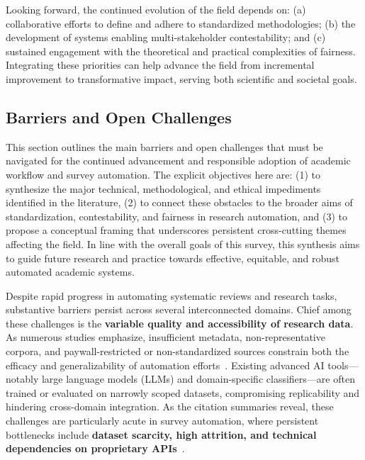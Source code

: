 \documentclass[sigconf]{acmart}
\begin{document}
Looking forward, the continued evolution of the field depends on: (a) collaborative efforts to define and adhere to standardized methodologies; (b) the development of systems enabling multi-stakeholder contestability; and (c) sustained engagement with the theoretical and practical complexities of fairness. Integrating these priorities can help advance the field from incremental improvement to transformative impact, serving both scientific and societal goals.

\subsection{Barriers and Open Challenges}

This section outlines the main barriers and open challenges that must be navigated for the continued advancement and responsible adoption of academic workflow and survey automation. The explicit objectives here are: (1) to synthesize the major technical, methodological, and ethical impediments identified in the literature, (2) to connect these obstacles to the broader aims of standardization, contestability, and fairness in research automation, and (3) to propose a conceptual framing that underscores persistent cross-cutting themes affecting the field. In line with the overall goals of this survey, this synthesis aims to guide future research and practice towards effective, equitable, and robust automated academic systems.

Despite rapid progress in automating systematic reviews and research tasks, substantive barriers persist across several interconnected domains. Chief among these challenges is the \textbf{variable quality and accessibility of research data}. As numerous studies emphasize, insufficient metadata, non-representative corpora, and paywall-restricted or non-standardized sources constrain both the efficacy and generalizability of automation efforts~\cite{ref41,ref42,ref43,ref44,ref54,ref55,ref56,ref57,ref60,ref61,ref62,ref63,ref64,ref65,ref68,ref70,ref71,ref73,ref74,ref75,ref76,ref78,ref80,ref81,ref82,ref83,ref84,ref85,ref86,ref87,ref88,ref89,ref90,ref91,ref92,ref93,ref94,ref95,ref96,ref97,ref98,ref99,ref100,ref103,ref104,ref105,ref106,ref108,ref109,ref110,ref111,ref112,ref113,ref114,ref115,ref117}. Existing advanced AI tools---notably large language models (LLMs) and domain-specific classifiers---are often trained or evaluated on narrowly scoped datasets, compromising replicability and hindering cross-domain integration. As the citation summaries reveal, these challenges are particularly acute in survey automation, where persistent bottlenecks include \textbf{dataset scarcity, high attrition, and technical dependencies on proprietary APIs}~\cite{ref117}.
\end{document}

